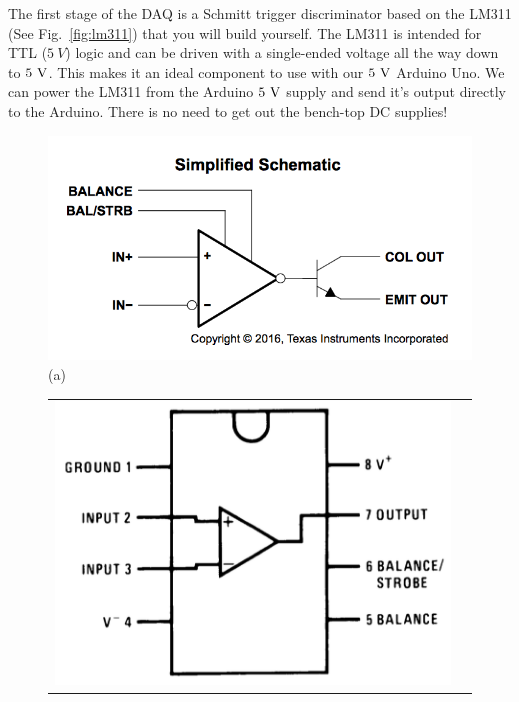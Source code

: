 \documentclass[12pt]{article}
\begin{document}
The first stage of the DAQ is a Schmitt trigger discriminator based on the LM311 (See Fig.~\ref{fig:lm311}) that you will build yourself.  The LM311 is intended for TTL ($5~V$) logic and can be driven with a single-ended voltage all the way down to $5~\rm V$.  This makes it an ideal component to use with our $5~\rm V$ Arduino Uno.  We can power the LM311 from the Arduino $5~\rm V$ supply and send it's output directly to the Arduino.  There is no need to get out the bench-top DC supplies!

\begin{figure}[thbp]
\begin{center}
{\includegraphics[height=0.2\textheight]{figs/LM311-scheme.png}}  \\
(a) \\ \vskip 1cm
\begin{tabular}{cc}
{\includegraphics[height=0.2\textheight]{figs/LM311.png}} &

\end{tabular}
\end{center}
\end{figure}
\end{document}
